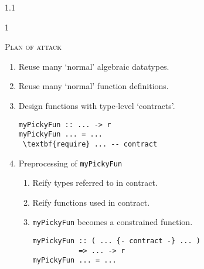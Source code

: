 \documentclass{slides}
\newcommand{\littleskip}{\topsep6pt \parskip6pt \partopsep6pt}
\newcommand{\header}[1]{{\large\scshape \color{Red} #1} \medskip }
\newenvironment{myslide}{\begin{slide}\color{Blue}\begin{boxedminipage}{1.1\hsize}\begin{boxedminipage}{1\hsize}\color{Black}
\vspace{-170\in}
}{%
\smallskip
\end{boxedminipage}
\end{boxedminipage}
\end{slide}}
\begin{document}



\begin{myslide}

\header{Plan of attack}

{\small

\littleskip
\begin{enumerate}
\item Reuse many `normal' algebraic datatypes.
\item Reuse many `normal' function definitions.
\item Design functions with type-level `contracts'.

\vspace{-42\in}
{\tiny
\begin{Verbatim}[fontseries=normal,fontsize=\tiny,commandchars=\\\{\}]
myPickyFun :: ... -> r
myPickyFun ... = ... 
 \textbf{require} ... -- contract
\end{Verbatim}
}
\item Preprocessing of \texttt{myPickyFun}
\begin{enumerate}
\item Reify types referred to in contract.
\item Reify functions used in contract.
\item \texttt{myPickyFun} becomes a constrained function.

\vspace{-42\in}
{\tiny\begin{Verbatim}
myPickyFun :: ( ... {- contract -} ... )
           => ... -> r
myPickyFun ... = ... 
\end{Verbatim}
}
\end{enumerate}
\end{enumerate}

}

\end{myslide}



\end{document}
